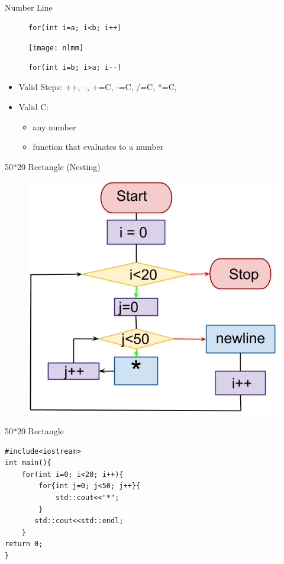 \documentclass[xcolor={dvipsnames}]{beamer}
\begin{document}
\begin{frame}[fragile]{Number Line}
\Large
\begin{figure}
	\begin{verbatim}
for(int i=a; i<b; i++)
	\end{verbatim}
	\texttt{[image: nlmm]}
	\begin{verbatim}
for(int i=b; i>a; i--)
	\end{verbatim}
\end{figure}
\pause
\begin{center}
	\begin{itemize}
	\item Valid Steps: ++, --, +=C, -=C, /=C, *=C,
	\item Valid C:
		\begin{itemize} 
		\item any number
		\item function that evaluates to a number 
		\end{itemize}
	\end{itemize}
\end{center}

\end{frame}


\begin{frame}{50*20 Rectangle (Nesting)}
\begin{figure}
		\includegraphics[width=.75\textwidth]{for_nest_line}
	\end{figure}
\end{frame}

\begin{frame}[fragile]{50*20 Rectangle}
\LARGE
\begin{verbatim}
#include<iostream>
int main(){
    for(int i=0; i<20; i++){
        for{int j=0; j<50; j++}{
            std::cout<<"*";
        }
       std::cout<<std::endl;
    }
return 0;
}
\end{verbatim}
\end{frame}
\end{document}
